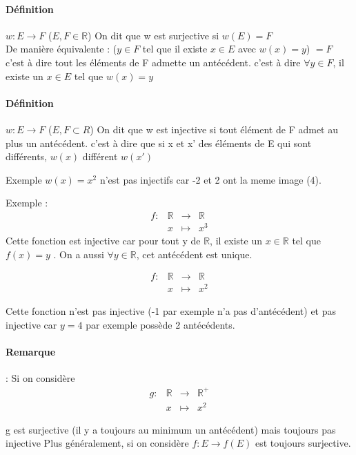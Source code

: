\paragraph{Définition} $w : E \rightarrow F$ ($E, F \in \mathbb{R}$)
On dit que w est surjective si $w(E) = F$ ~\\
De manière équivalente : ($y \in F$ tel que il existe $x \in E$ avec $w(x) = y$) $= F$ c'est à dire tout les éléments de F admette un antécédent.
c'est à dire $ \forall y \in F$, il existe un $x \in E$ tel que $w(x) = y$

\paragraph{Définition} $w : E \rightarrow F$ ($E, F \subset R$)
On dit que w est injective si tout élément de F admet au plus un antécédent.
c'est à dire que si x et x' des éléments de E qui sont différents, $w(x)$ différent $w(x')$

Exemple $w(x) = x^2$ n'est pas injectifs car -2 et 2 ont la meme image (4).

Exemple :
\[\begin{array}{rccl}
	f : & \mathbb{R} & \rightarrow & \mathbb{R} \\
	& x & \mapsto & x^3
\end{array}\]
Cette fonction est injective car pour tout y de $\mathbb{R}$, il existe un $x \in \mathbb{R}$ tel que $f(x) = y$ . On a aussi $\forall y \in \mathbb{R}$, cet antécédent est unique.

\[\begin{array}{rccl}
	f : & \mathbb{R} & \rightarrow & \mathbb{R} \\
	& x & \mapsto & x^2
\end{array}\]

Cette fonction n'est pas injective (-1 par exemple n'a pas d'antécédent) et pas injective car $y=4$ par exemple possède 2 antécédents.

\paragraph{Remarque} : Si on considère 
\[\begin{array}{rccl}
	g : & \mathbb{R} & \rightarrow & \mathbb{R}^+ \\
	& x & \mapsto & x^2
\end{array}\]

g est surjective (il y a toujours au minimum un antécédent) mais toujours pas injective
Plus généralement, si on considère $f:E \rightarrow f(E)$ est toujours surjective.

